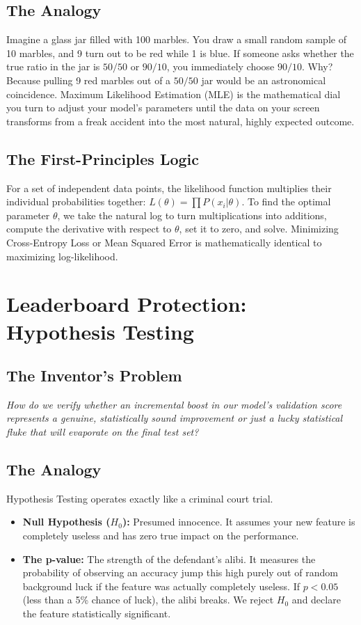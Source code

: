 \documentclass[12pt,a4paper]{article}
\begin{document}
\subsection*{The Analogy}
Imagine a glass jar filled with 100 marbles. You draw a small random sample of 10 marbles, and 9 turn out to be red while 1 is blue. If someone asks whether the true ratio in the jar is $50/50$ or $90/10$, you immediately choose $90/10$. Why? Because pulling 9 red marbles out of a $50/50$ jar would be an astronomical coincidence. Maximum Likelihood Estimation (MLE) is the mathematical dial you turn to adjust your model's parameters until the data on your screen transforms from a freak accident into the most natural, highly expected outcome.

\subsection*{The First-Principles Logic}
For a set of independent data points, the likelihood function multiplies their individual probabilities together: $L(\theta) = \prod P(x_i | \theta)$. To find the optimal parameter $\theta$, we take the natural log to turn multiplications into additions, compute the derivative with respect to $\theta$, set it to zero, and solve. Minimizing Cross-Entropy Loss or Mean Squared Error is mathematically identical to maximizing log-likelihood.

\section{Leaderboard Protection: Hypothesis Testing}
\subsection*{The Inventor's Problem}
\textit{How do we verify whether an incremental boost in our model's validation score represents a genuine, statistically sound improvement or just a lucky statistical fluke that will evaporate on the final test set?}

\subsection*{The Analogy}
Hypothesis Testing operates exactly like a criminal court trial.
\begin{itemize}
    \item \textbf{Null Hypothesis ($H_0$):} Presumed innocence. It assumes your new feature is completely useless and has zero true impact on the performance.
    \item \textbf{The p-value:} The strength of the defendant's alibi. It measures the probability of observing an accuracy jump this high purely out of random background luck if the feature was actually completely useless. If $p < 0.05$ (less than a 5\% chance of luck), the alibi breaks. We reject $H_0$ and declare the feature statistically significant.
\end{itemize}
\end{document}
